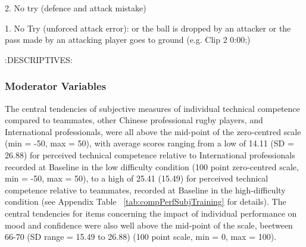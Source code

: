 2. No try (defence and attack mistake)

1. No Try (unforced attack error):  or the ball is dropped by an attacker or the pass made by an attacking player goes to ground (e.g. Clip 2 0:00;)








:DESCRIPTIVES:

%
%
%
%
%
%
%
%
%
%
%
%


%
%
%


\subsubsection{Moderator Variables}

The central tendencies of subjective measures of individual technical competence compared to teammates, other Chinese professional rugby players, and International professionals, were all above the mid-point of the zero-centred scale (min = -50, max = 50), with average scores ranging from  a low of 14.11 (SD = 26.88) for perceived technical competence relative to International professionals recorded at Baseline in the low difficulty condition (100 point zero-centred scale, min = -50, max = 50), to a high of 25.41 (15.49) for perceived technical competence relative to teammates, recorded at Baseline in the high-difficulty condition (see Appendix Table ~\ref{tab:compPerfSubjTraining} for details).  The central tendencies for items concerning the impact of individual performance on mood and confidence were also well above the mid-point of the scale, beetween 66-70 (SD range = 15.49 to 26.88) (100 point scale, min = 0, max = 100).




